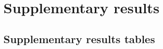 \documentclass[11pt]{article}
\begin{document}
\section{Supplementary results}\label{appendix-d}

\subsection{Supplementary results tables}\label{supplementary-results-tables}

%
\end{document}
